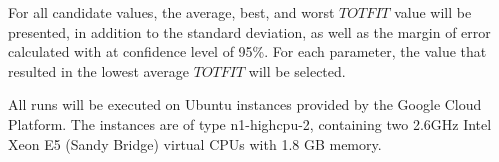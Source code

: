 For all candidate values, the average, best, and worst $TOTFIT$ value will be presented, in addition to the standard deviation, as well as the margin of error calculated with at confidence level of 95\%. For each parameter, the value that resulted in the lowest average $TOTFIT$ will be selected. 

All runs will be executed on Ubuntu instances provided by the Google Cloud Platform\citep{website:google}. The instances are of type n1-highcpu-2, containing two 2.6GHz Intel Xeon E5 (Sandy Bridge) virtual CPUs with 1.8 GB memory. 

